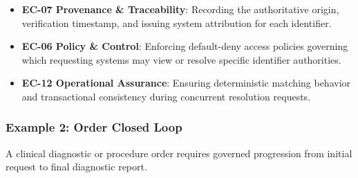 \begin{itemize}
\begin{itemize}
\item 
\textbf{EC-07 Provenance \& Traceability}: Recording the authoritative origin, verification timestamp, and issuing system attribution for each identifier.



\item 
\textbf{EC-06 Policy \& Control}: Enforcing default-deny access policies governing which requesting systems may view or resolve specific identifier authorities.



\item 
\textbf{EC-12 Operational Assurance}: Ensuring deterministic matching behavior and transactional consistency during concurrent resolution requests.



\end{itemize}


\end{itemize}
\label{rad:tier-model:208}

\par\smallskip
{}\label{rad:tier-model:210}
\subsubsection*{Example 2: Order Closed Loop}
\label{rad:tier-model:212}

A clinical diagnostic or procedure order requires governed progression from initial request to final diagnostic report.

\label{rad:tier-model:214}

